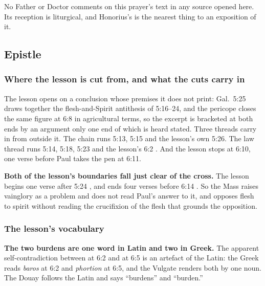 No Father or Doctor comments on this prayer's text in any source opened here. Its
reception is liturgical, and Honorius's 
is the nearest thing to an exposition of it.

\subsection*{Epistle }

\subsubsection*{Where the lesson is cut from, and what the cuts carry in}

The lesson opens on a conclusion whose premises it does not print: Gal.~5:25
 draws together the
flesh-and-Spirit antithesis of 5:16--24, and the pericope closes the same figure
at 6:8 in agricultural terms, so the excerpt is bracketed at both ends by an
argument only one end of which is heard stated. Three threads carry in from
outside it. The  chain runs 5:13, 5:15 and the lesson's own 5:26.
The law thread runs 5:14, 5:18, 5:23 and the lesson's 6:2 . And the lesson stops at 6:10, one verse before Paul takes the pen
at 6:11.

\textbf{Both of the lesson's boundaries fall just clear of the cross.} The lesson
begins one verse after 5:24 , and ends four verses before 6:14 . So the Mass raises vainglory
as a problem and does not read Paul's answer to it, and opposes flesh to spirit
without reading the crucifixion of the flesh that grounds the opposition.

\subsubsection*{The lesson's vocabulary}

\textbf{The two burdens are one word in Latin and two in Greek.} The apparent
self-contradiction between  at 6:2 and
 at 6:5 is an artefact of the Latin:
the Greek reads \emph{baros} at 6:2 and \emph{phortion} at 6:5, and the Vulgate
renders both by one noun. The Douay follows the Latin and says ``burdens'' and
``burden.''

